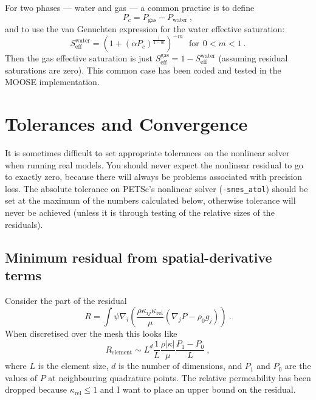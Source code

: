 \documentclass[]{scrreprt}
\begin{document}
For two phases --- water and gas --- a common practise is to define
\begin{equation}
P_{c} = P_{\mathrm{gas}} - P_{\mathrm{water}} \ ,
\end{equation}
and to use the van Genuchten expression for the
water effective saturation:
\begin{equation}
S^{\mathrm{water}}_{\mathrm{eff}} = \left( 1 + (\alpha P_{c})^{\frac{1}{1 - m}}
\right)^{-m} \ \ \ \mbox{for}\ \ 0<m<1 \ .
\end{equation}
Then the gas effective saturation is just
$S^{\mathrm{gas}}_{\mathrm{eff}} = 1 -
S^{\mathrm{water}}_{\mathrm{eff}}$ (assuming residual saturations are
zero).  This common case has been coded and tested in the MOOSE implementation.





\chapter{Tolerances and Convergence}
\label{tol.chap}

It is sometimes difficult to set appropriate tolerances on the
nonlinear solver when running real models.  You should never expect
the nonlinear residual to go to exactly zero, because there will
always be problems associated with precision loss.  The absolute
tolerance on PETSc's nonlinear solver ({\tt{-snes\_atol}}) should be
set at the maximum of the numbers calculated below, otherwise
tolerance will never be achieved (unless it is through testing of the
relative sizes of the residuals).

\section{Minimum residual from spatial-derivative terms}
\label{sec.min.res.spat}

Consider the part of the residual
\begin{equation}
R = \int \psi \nabla_{i}
\left( \frac{\rho \kappa_{ij}\kappa_{\mathrm{rel}}}{\mu} (\nabla_{j}P
- \rho_{0} g_{j}) \right) \ .
\end{equation}
When discretised over the mesh this looks like
\begin{equation}
R_{\mathrm{element}} \sim L^{d} \frac{1}{L} \frac{\rho|\kappa|}{\mu}\frac{P_{1}-P_{0}}{L}
\ ,
\end{equation}
where $L$ is the element size, $d$ is the number of dimensions, and
$P_{1}$ and $P_{0}$ are the values of $P$ at neighbouring quadrature
points.  The relative permeability has been dropped because
$\kappa_{\mathrm{rel}}\leq 1$ and I want to place an upper bound on
the residual.
\end{document}
